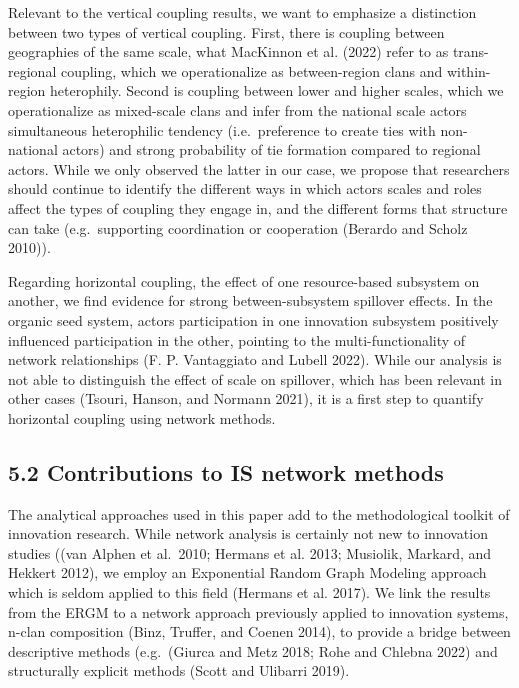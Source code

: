 \documentclass[twoside,12pt,final]{ucthesis-CA2012}
\begin{document}
\begin{ucmainmatter}
Relevant to the vertical coupling results, we want to emphasize a
distinction between two types of vertical coupling. First, there is
coupling between geographies of the same scale, what MacKinnon et al.
(2022) refer to as trans-regional coupling, which we operationalize as
between-region clans and within-region heterophily. Second is coupling
between lower and higher scales, which we operationalize as mixed-scale
clans and infer from the national scale actors\textquotesingle{} simultaneous
heterophilic tendency (i.e.~preference to create ties with non-national
actors) and strong probability of tie formation compared to regional
actors. While we only observed the latter in our case, we propose that
researchers should continue to identify the different ways in which
actors\textquotesingle{} scales and roles affect the types of coupling they engage in,
and the different forms that structure can take (e.g.~supporting
coordination or cooperation (Berardo and Scholz
2010)).

Regarding horizontal coupling, the effect of one resource-based
subsystem on another, we find evidence for strong between-subsystem
spillover effects. In the organic seed system, actors\textquotesingle{} participation in
one innovation subsystem positively influenced participation in the
other, pointing to the multi-functionality of network relationships (F.
P. Vantaggiato and Lubell
2022). While our analysis
is not able to distinguish the effect of scale on spillover, which has
been relevant in other cases (Tsouri, Hanson, and Normann
2021), it is a first step
to quantify horizontal coupling using network methods.

\hypertarget{contributions-to-is-network-methods}{%
\subsection{5.2 Contributions to IS network methods}\label{contributions-to-is-network-methods}}

The analytical approaches used in this paper add to the methodological
toolkit of innovation research. While network analysis is certainly not
new to innovation studies ((van Alphen et al.~2010; Hermans et al.
2013; Musiolik, Markard, and Hekkert
2012), we employ an
Exponential Random Graph Modeling approach which is seldom applied to
this field (Hermans et al.
2017). We link the results
from the ERGM to a network approach previously applied to innovation
systems, n-clan composition (Binz, Truffer, and Coenen
2014), to provide a bridge
between descriptive methods (e.g.~(Giurca and Metz 2018; Rohe and
Chlebna 2022) and
structurally explicit methods (Scott and Ulibarri
2019).


\end{ucmainmatter}
\end{document}
